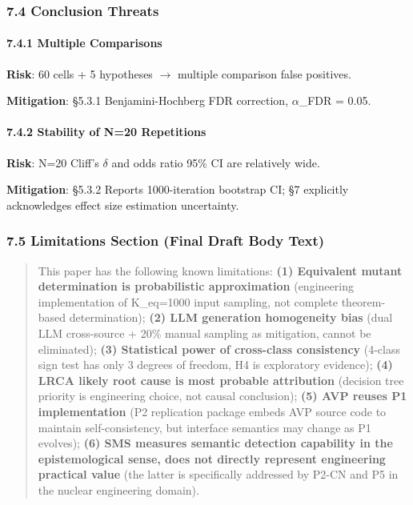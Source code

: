 \documentclass[review,12pt,authoryear]{elsarticle}
\begin{document}
\subsubsection{7.4 Conclusion Threats}\label{conclusion-threats}

\paragraph{7.4.1 Multiple Comparisons}\label{multiple-comparisons-1}

\textbf{Risk}: 60 cells + 5 hypotheses $\to$ multiple comparison false
positives.

\textbf{Mitigation}: §5.3.1 Benjamini-Hochberg FDR correction, $\alpha$\_FDR =
0.05.

\paragraph{7.4.2 Stability of N=20
Repetitions}\label{stability-of-n20-repetitions}

\textbf{Risk}: N=20 Cliff's $\delta$ and odds ratio 95\% CI are relatively
wide.

\textbf{Mitigation}: §5.3.2 Reports 1000-iteration bootstrap CI; §7
explicitly acknowledges effect size estimation uncertainty.

\subsubsection{7.5 Limitations Section (Final Draft Body
Text)}\label{limitations-section-final-draft-body-text}

\begin{quote}
This paper has the following known limitations: \textbf{(1) Equivalent
mutant determination is probabilistic approximation} (engineering
implementation of K\_eq=1000 input sampling, not complete theorem-based
determination); \textbf{(2) LLM generation homogeneity bias} (dual LLM
cross-source + 20\% manual sampling as mitigation, cannot be
eliminated); \textbf{(3) Statistical power of cross-class consistency}
(4-class sign test has only 3 degrees of freedom, H4 is exploratory
evidence); \textbf{(4) LRCA likely root cause is most probable
attribution} (decision tree priority is engineering choice, not causal
conclusion); \textbf{(5) AVP reuses P1 implementation} (P2 replication
package embeds AVP source code to maintain self-consistency, but
interface semantics may change as P1 evolves); \textbf{(6) SMS measures
semantic detection capability in the epistemological sense, does not
directly represent engineering practical value} (the latter is
specifically addressed by P2-CN and P5 in the nuclear engineering
domain).
\end{quote}
\end{document}
